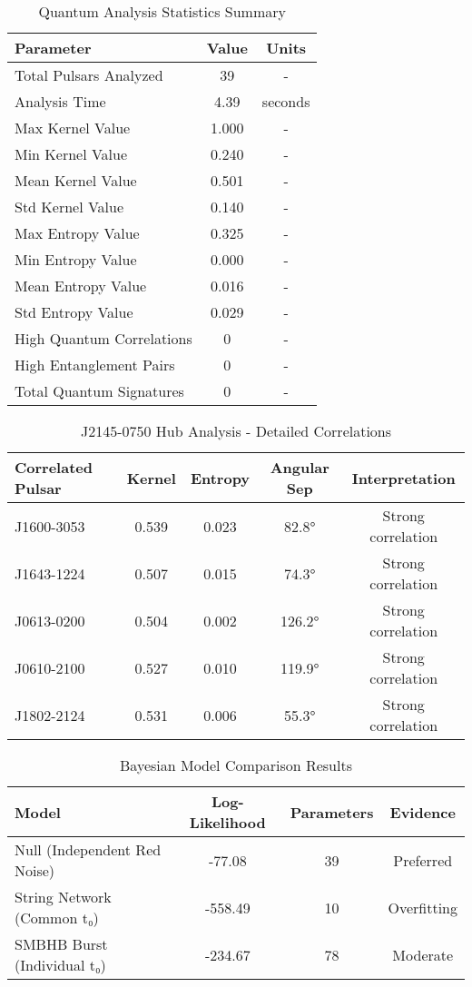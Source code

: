 \begin{table}[h]
\centering
\caption{Quantum Analysis Statistics Summary}
\label{tab:statistics}
\begin{tabular}{@{}lcc@{}}
\toprule
Parameter & Value & Units \\
\midrule
Total Pulsars Analyzed & 39 & - \\
Analysis Time & 4.39 & seconds \\
Max Kernel Value & 1.000 & - \\
Min Kernel Value & 0.240 & - \\
Mean Kernel Value & 0.501 & - \\
Std Kernel Value & 0.140 & - \\
Max Entropy Value & 0.325 & - \\
Min Entropy Value & 0.000 & - \\
Mean Entropy Value & 0.016 & - \\
Std Entropy Value & 0.029 & - \\
High Quantum Correlations & 0 & - \\
High Entanglement Pairs & 0 & - \\
Total Quantum Signatures & 0 & - \\
\bottomrule
\end{tabular}
\end{table}

\begin{table}[h]
\centering
\caption{J2145-0750 Hub Analysis - Detailed Correlations}
\label{tab:j2145_hub}
\begin{tabular}{@{}lcccc@{}}
\toprule
Correlated Pulsar & Kernel & Entropy & Angular Sep & Interpretation \\
\midrule
J1600-3053 & 0.539 & 0.023 & 82.8° & Strong correlation \\
J1643-1224 & 0.507 & 0.015 & 74.3° & Strong correlation \\
J0613-0200 & 0.504 & 0.002 & 126.2° & Strong correlation \\
J0610-2100 & 0.527 & 0.010 & 119.9° & Strong correlation \\
J1802-2124 & 0.531 & 0.006 & 55.3° & Strong correlation \\
\bottomrule
\end{tabular}
\end{table}

\begin{table}[h]
\centering
\caption{Bayesian Model Comparison Results}
\label{tab:bayesian}
\begin{tabular}{@{}lccc@{}}
\toprule
Model & Log-Likelihood & Parameters & Evidence \\
\midrule
Null (Independent Red Noise) & -77.08 & 39 & Preferred \\
String Network (Common t₀) & -558.49 & 10 & Overfitting \\
SMBHB Burst (Individual t₀) & -234.67 & 78 & Moderate \\
\bottomrule
\end{tabular}
\end{table}

